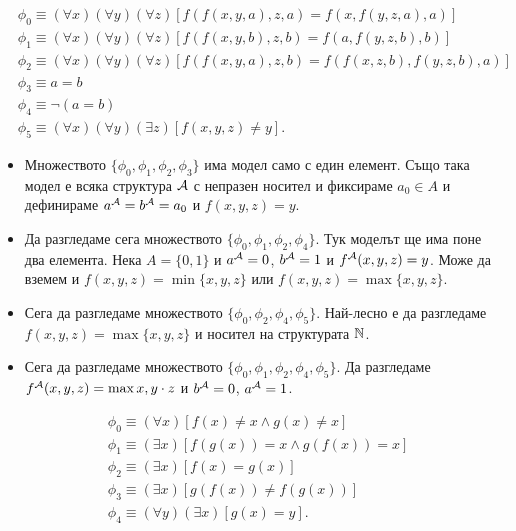 \begin{example}
  \begin{align*}
    & \phi_0 \equiv (\forall x)(\forall y)(\forall z)[f(f(x,y,a),z,a) = f(x,f(y,z,a),a)]\\
    & \phi_1 \equiv (\forall x)(\forall y)(\forall z)[f(f(x,y,b),z,b) = f(a,f(y,z,b),b)]\\
    & \phi_2 \equiv (\forall x)(\forall y)(\forall z)[f(f(x,y,a),z,b) = f(f(x,z,b),f(y,z,b),a)]\\
    & \phi_3 \equiv a = b\\
    & \phi_4 \equiv \neg(a = b)\\
    & \phi_5 \equiv (\forall x)(\forall y)(\exists z)[ f(x,y,z) \neq y].
  \end{align*}
  \begin{itemize}
  \item
    Множеството $\{\phi_0,\phi_1,\phi_2,\phi_3\}$ има модел само с един елемент.
    Също така модел е всяка структура $\mathcal{A}$ с непразен носител и фиксираме $a_0 \in A$ и дефинираме $a^{\mathcal{A}} = b^{\mathcal{A}} = a_0$ и $f(x,y,z) = y$.
  \item
    Да разгледаме сега множеството $\{\phi_0,\phi_1,\phi_2,\phi_4\}$.
    Тук моделът ще има поне два елемента.
    Нека $A = \{0,1\}$ и $a^{\mathcal{A}} = 0$, $b^{\mathcal{A}} = 1$ и $f^{\mathcal{A}}(x,y,z) = y$.
    Може да вземем и $f(x,y,z) = \min\{x,y,z\}$ или $f(x,y,z) = \max\{x,y,z\}$.
  \item
    Сега да разгледаме множеството $\{\phi_0,\phi_2,\phi_4, \phi_5\}$.
    Най-лесно е да разгледаме $f(x,y,z) = \max\{x,y,z\}$ и носител на структурата $\mathbb{N}$.
  \item
    Сега да разгледаме множеството $\{\phi_0,\phi_1,\phi_2,\phi_4, \phi_5\}$.
    Да разгледаме $f^{\mathcal{A}}(x,y,z) = \max{x,y} \cdot z$ и $b^{\mathcal{A}} = 0$, $a^{\mathcal{A}} = 1$.
  \end{itemize}
\end{example}


\begin{example}
  \begin{align*}
    & \phi_0 \equiv (\forall x)[f(x) \neq x \land g(x) \neq x]\\
    & \phi_1 \equiv (\exists x)[f(g(x)) = x \land g(f(x)) = x]\\
    & \phi_2 \equiv (\exists x)[f(x) = g(x)]\\
    & \phi_3 \equiv (\exists x)[g(f(x)) \neq f(g(x))]\\
    & \phi_4 \equiv (\forall y)(\exists x)[g(x) = y].
  \end{align*}
\end{example}


